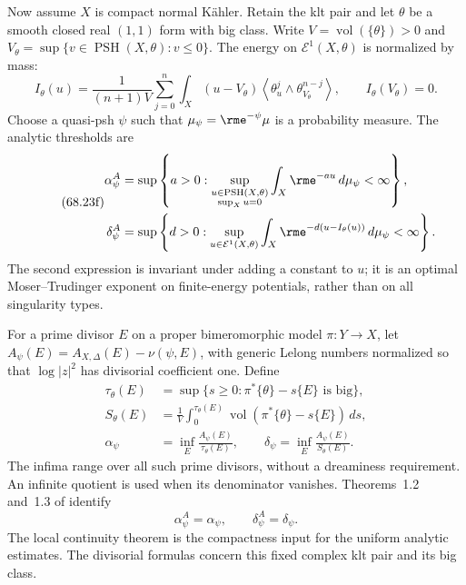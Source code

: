 Now assume $X$ is compact normal K\"ahler. Retain the klt pair
and let $\theta$ be a smooth closed real $(1,1)$ form with big
class. Write $V=\operatorname{vol}(\{\theta\})>0$ and
$V_\theta=\sup\{v\in\operatorname{PSH}(X,\theta):v\leq0\}$.
The energy on $\mathcal E^1(X,\theta)$ is normalized by mass:
\[
 I_\theta(u)=\frac1{(n+1)V}\sum_{j=0}^n
 \int_X(u-V_\theta)
 \left\langle\theta_u^j\wedge\theta_{V_\theta}^{n-j}\right\rangle,
 \qquad I_\theta(V_\theta)=0.
\]
Choose a quasi-psh $\psi$ such that
$\mu_\psi=\rme^{-\psi}\mu$ is a probability measure. The analytic
thresholds are
\[
\tag{68.23f}\label{eq:ytd-klt-analytic-thresholds}
\begin{aligned}
 \alpha^A_\psi
 &=\sup\left\{a>0:
   \sup_{\substack{u\in\operatorname{PSH}(X,\theta)\\\sup_Xu=0}}
                \int_X\rme^{-au}\,d\mu_\psi<\infty\right\},\\
 \delta^A_\psi
 &=\sup\left\{d>0:
   \sup_{u\in\mathcal E^1(X,\theta)}
        \int_X\rme^{-d(u-I_\theta(u))}\,d\mu_\psi<\infty\right\}.
\end{aligned}
\]
The second expression is invariant under adding a constant to $u$;
it is an optimal Moser--Trudinger exponent on finite-energy
potentials, rather than on all singularity types.

For a prime divisor $E$ on a proper bimeromorphic model
$\pi:Y\to X$, let
$A_\psi(E)=A_{X,\Delta}(E)-\nu(\psi,E)$, with generic Lelong
numbers normalized so that $\log|z|^2$ has divisorial coefficient
one. Define
\[
\tag{68.23g}\label{eq:ytd-klt-divisorial-thresholds}
\begin{aligned}
 \tau_\theta(E)&=\sup\{s\geq0:\pi^*\{\theta\}-s\{E\}
                                 \text{ is big}\},\\
 S_\theta(E)&=\frac1V\int_0^{\tau_\theta(E)}
           \operatorname{vol}(\pi^*\{\theta\}-s\{E\})\,ds,\\
 \alpha_\psi&=\inf_E\frac{A_\psi(E)}{\tau_\theta(E)},
 \qquad \delta_\psi=\inf_E\frac{A_\psi(E)}{S_\theta(E)}.
\end{aligned}
\]
The infima range over all such prime divisors, without a
dreaminess requirement. An infinite quotient is used when its
denominator vanishes. Theorems~1.2 and~1.3 of
\cite{DarvasZhang26KltV2} identify
\[
             \alpha^A_\psi=\alpha_\psi,
             \qquad \delta^A_\psi=\delta_\psi.
\]
The local continuity theorem is the compactness input for the
uniform analytic estimates. The divisorial formulas concern this
fixed complex klt pair and its big class.

